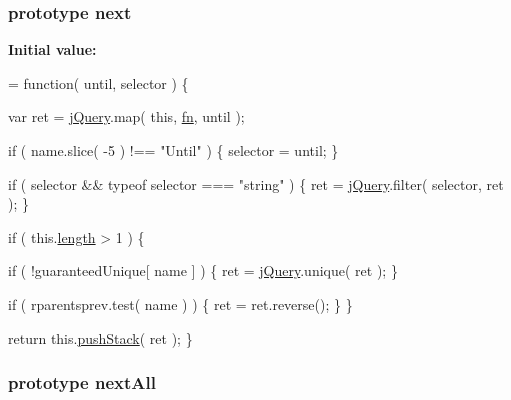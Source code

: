 \hypertarget{jquery-1_810_82-vsdoc_8js_a61213ec31ab21de6b8fbe75332157524}{
\subsubsection[{next}]{ {\bf prototype} next}}\label{jquery-1_810_82-vsdoc_8js_a61213ec31ab21de6b8fbe75332157524}
{\bfseries Initial value\-:}
\begin{DoxyCode}
= \textcolor{keyword}{function}( until, selector ) \{


        var ret = \hyperlink{jquery-1_810_82-vsdoc_8js_add5237586d970a38a81f990e8eb28c6c}{jQuery}.map( \textcolor{keyword}{this}, \hyperlink{jquery-1_810_82-vsdoc_8js_acef6bdaf6b9b20fdcca1ea86f0902c3b}{fn}, until );

        \textcolor{keywordflow}{if} ( name.slice( -5 ) !== \textcolor{stringliteral}{"Until"} ) \{
            selector = until;
        \}

        \textcolor{keywordflow}{if} ( selector && typeof selector === \textcolor{stringliteral}{"string"} ) \{
            ret = \hyperlink{jquery-1_810_82-vsdoc_8js_add5237586d970a38a81f990e8eb28c6c}{jQuery}.filter( selector, ret );
        \}

        \textcolor{keywordflow}{if} ( this.\hyperlink{jquery-1_810_82-vsdoc_8js_aa7de35d58da66d9944ab9cbe82c19640}{length} > 1 ) \{
            
            \textcolor{keywordflow}{if} ( !guaranteedUnique[ name ] ) \{
                ret = \hyperlink{jquery-1_810_82-vsdoc_8js_add5237586d970a38a81f990e8eb28c6c}{jQuery}.unique( ret );
            \}

            
            \textcolor{keywordflow}{if} ( rparentsprev.test( name ) ) \{
                ret = ret.reverse();
            \}
        \}

        \textcolor{keywordflow}{return} this.\hyperlink{jquery-1_810_82-vsdoc_8js_afc3a7db1ef2b526338c06c07cecccd44}{pushStack}( ret );
    \}
\end{DoxyCode}
\hypertarget{jquery-1_810_82-vsdoc_8js_ab697a9d23cedbe3a7f45e620bd250001}{
\subsubsection[{next\-All}]{ {\bf prototype} next\-All}}\label{jquery-1_810_82-vsdoc_8js_ab697a9d23cedbe3a7f45e620bd250001}
